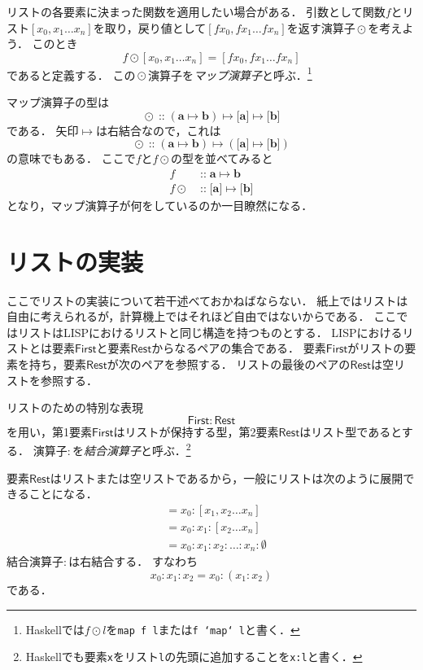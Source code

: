 \documentclass[twocolumn]{jsbook}
\newcommand{\hsklType}[1]{\textbf{#1}}
\DeclareMathOperator{\hsklMap}{\odot}
\DeclareMathOperator{\hsklOf}{::}
\newcommand{\hsklEmptyList}{\emptyset}
\newcommand{\hsklListType}[1]{\boldsymbol{[}#1\boldsymbol{]}}
\newcommand{\mathVarKeyword}[1]{\mathsf{#1}}
\DeclareMathOperator{\mathIn}{::}
\DeclareMathOperator{\mathMapsTo}{\mapsto}
\newcommand{\mathFirst}{\mathVarKeyword{First}}
\newcommand{\mathRest}{\mathVarKeyword{Rest}}
\newcommand{\mathMorph}[2]{#1\mathMapsTo#2}
\newcommand{\mathMorphII}[3]{#1\mathMapsTo#2\mathMapsTo#3}
\newcommand{\keyword}[1]{\emph{#1}}
\newcommand{\code}[1]{\texttt{#1}}
\newcommand{\rangedots}{\dots}
\begin{document}
リストの各要素に決まった関数を適用したい場合がある．
引数として関数$f$とリスト$[x_0,x_1\dots x_n]$を取り，戻り値として$[fx_0,fx_1\dots fx_n]$を返す演算子$\hsklMap$を考えよう．
このとき$$f\hsklMap[x_0,x_1\dots x_n]=[fx_0,fx_1\dots fx_n]$$であると定義する．
この$\hsklMap$演算子を\keyword{マップ演算子}と呼ぶ．\footnote{Haskellでは$f\hsklMap l$を\code{map f l}または\code{f `map` l}と書く．}

マップ演算子の型は
$$\hsklMap\hsklOf{}\mathMorphII{(\mathMorph{\hsklType{a}}{\hsklType{b}})}{\hsklListType{\hsklType{a}}}{\hsklListType{\hsklType{b}}}$$
である．
矢印$\mathMapsTo$は右結合なので，これは$$\hsklMap\hsklOf{}\mathMorph{(\mathMorph{\hsklType{a}}{\hsklType{b}})}{(\mathMorph{\hsklListType{\hsklType{a}}}{\hsklListType{\hsklType{b}}})}$$の意味でもある．
ここで$f$と$f\hsklMap$の型を並べてみると
\begin{align*}
f&\mathIn\mathMorph{\hsklType{a}}{\hsklType{b}}\\
f\hsklMap&\mathIn\mathMorph{\hsklListType{\hsklType{a}}}{\hsklListType{\hsklType{b}}}
\end{align*}
となり，マップ演算子が何をしているのか一目瞭然になる．

\section{リストの実装}

ここでリストの実装について若干述べておかねばならない．
紙上ではリストは自由に考えられるが，計算機上ではそれほど自由ではないからである．
ここではリストはLISPにおけるリストと同じ構造を持つものとする．
LISPにおけるリストとは要素$\mathFirst$と要素$\mathRest$からなるペアの集合である．
要素$\mathFirst$がリストの要素を持ち，要素$\mathRest$が次のペアを参照する．
リストの最後のペアの$\mathRest$は空リストを参照する．

リストのための特別な表現$$\mathFirst:\mathRest$$を用い，第1要素$\mathFirst$はリストが保持する型，第2要素$\mathRest$はリスト型であるとする．
演算子$:$を\keyword{結合演算子}と呼ぶ．\footnote{Haskellでも要素\code{x}をリスト\code{l}の先頭に追加することを\code{x:l}と書く．}

要素$\mathRest$はリストまたは空リストであるから，一般にリストは次のように展開できることになる．
\begin{align*}
[x_0,x_1,x_2\rangedots x_n]&=x_0:[x_1,x_2\rangedots x_n]\\
&=x_0:x_1:[x_2\rangedots x_n]\\
&=x_0:x_1:x_2:\dots:x_n:\hsklEmptyList
\end{align*}
結合演算子$:$は右結合する．
すなわち$$x_0:x_1:x_2=x_0:(x_1:x_2)$$である．
\end{document}
